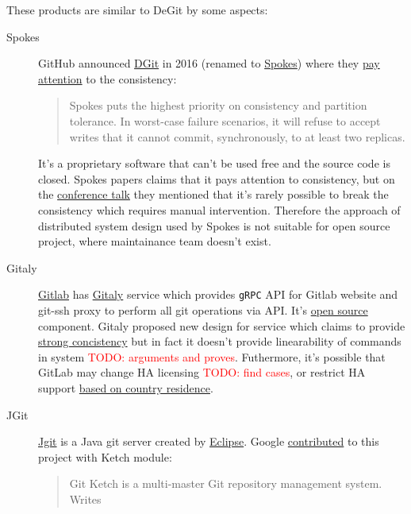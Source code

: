 \documentclass[acmlarge, screen, nonacm]{acmart}
\newcommand{\code}[1]{\texttt{#1}}
\newcommand{\todo}[1]{\textcolor{red}{TODO: #1}}
\begin{document}
These products are similar to DeGit by some aspects:
\begin{description}
  \item[Spokes]
    GitHub announced \href{https://github.blog/2016-04-05-introducing-dgit/}{DGit}
    in 2016 (renamed to \href{https://github.blog/2016-09-07-building-resilience-in-spokes/}{Spokes})
    where they \href{https://github.blog/2016-09-07-building-resilience-in-spokes/#defining-resilience}{pay attention}
    to the consistency:
    \begin{quote}
      Spokes puts the highest priority on consistency and partition tolerance.
      In worst-case failure scenarios, it will refuse to accept writes that it cannot commit,
      synchronously, to at least two replicas.
    \end{quote}
    It's a proprietary software that can't be used free and the source code is closed.
    Spokes papers claims that it pays attention to consistency, but on the
    \href{https://www.youtube.com/watch?v=DY0yNRNkYb0}{conference talk} they mentioned that
    it's rarely possible to break the consistency which requires manual intervention.
    Therefore the approach of distributed system design used by Spokes is not suitable for open
    source project, where maintainance team doesn't exist.
  \item[Gitaly]
    \href{https://docs.gitlab.com/ee/README.html}{Gitlab} has
    \href{https://docs.gitlab.com/ee/administration/gitaly/}{Gitaly} service which provides
    \code{gRPC} API for Gitlab website and git-ssh proxy to perform all git operations via API.
    It's \href{https://gitlab.com/gitlab-org/gitaly}{open source} component.
    Gitaly proposed new design for service which claims to provide
    \href{https://gitlab.com/gitlab-org/gitaly/-/blob/master/doc/design\_ha.md\#strong-consistency-design}{strong concistency}
    but in fact it doesn't provide linearability of commands in system \todo{arguments and proves}.
    Futhermore, it's possible that GitLab may change HA licensing \todo{find cases},
    or restrict HA support \href{https://news.ycombinator.com/item?id=21437334}{based on country residence}.
  \item[JGit]
    \href{https://www.eclipse.org/jgit/}{Jgit} is a Java git server created by \href{https://www.eclipse.org/}{Eclipse}.
    Google \href{https://www.eclipse.org//lists/jgit-dev/msg03073.html}{contributed} to this project with Ketch module:
    \begin{quote}
      Git Ketch is a multi-master Git repository management system. Writes

\end{quote}
\end{description}
\end{document}
